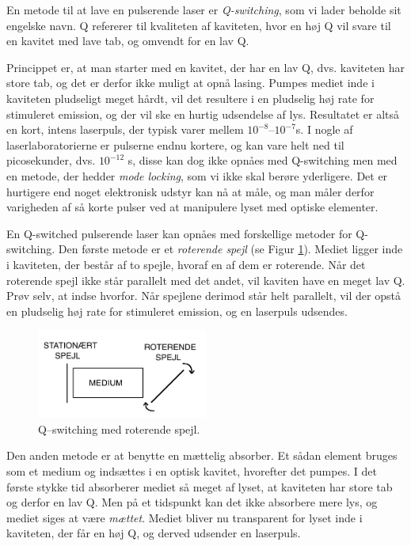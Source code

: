 En metode til at lave en pulserende laser er \emph{Q-switching}, som vi lader beholde sit engelske navn. Q refererer til kvaliteten af kaviteten, hvor en høj Q vil svare til en kavitet med lave tab, og omvendt for en lav Q. 

Princippet er, at man starter med en kavitet, der har en lav Q, dvs. kaviteten har store tab, og det er derfor ikke muligt at opnå lasing. Pumpes mediet inde i kaviteten pludseligt meget hårdt, vil det resultere i en pludselig høj rate for stimuleret emission, og der vil ske en hurtig udsendelse af lys. Resultatet er altså en kort, intens laserpuls, der typisk varer mellem $10^{-8}$--$10^{-7}$s. I nogle af laserlaboratorierne er pulserne endnu kortere, og kan vare helt ned til picosekunder, dvs. $10^{-12}$ s, disse kan dog ikke opnåes med Q-switching men med en metode, der hedder \emph{mode locking}, som vi ikke skal berøre yderligere. Det er hurtigere end noget elektronisk udstyr kan nå at måle, og man måler derfor varigheden af så korte pulser ved at manipulere lyset med optiske elementer. 

En Q-switched pulserende laser kan opnåes med forskellige metoder for Q-switching. Den første metode er et \emph{roterende spejl} (se Figur \ref{fig:rotspejl}). 
Mediet ligger inde i kaviteten, der består af to spejle, hvoraf en af dem er roterende. Når det roterende spejl ikke står parallelt med det andet, vil kaviten have en meget lav Q. Prøv selv, at indse hvorfor. Når spejlene derimod står helt parallelt, vil der opstå en pludselig høj rate for stimuleret emission, og en laserpuls udsendes. 

\begin{figure}[h!]
  \centering
  \includegraphics[width=0.5\textwidth]{Laserfysik/rotspejl.png}
  \caption{Q--switching med roterende spejl.}
  \label{fig:rotspejl}
\end{figure}

Den anden metode er at benytte en mættelig absorber. Et sådan element bruges som et medium og indsættes i en optisk kavitet, hvorefter det pumpes. I det første stykke tid absorberer mediet så meget af lyset, at kaviteten har store tab og derfor en lav Q. Men på et tidspunkt kan det ikke absorbere mere lys, og mediet siges at være \emph{mættet}. Mediet bliver nu transparent for lyset inde i kaviteten, der får en høj Q, og derved udsender en laserpuls. 

